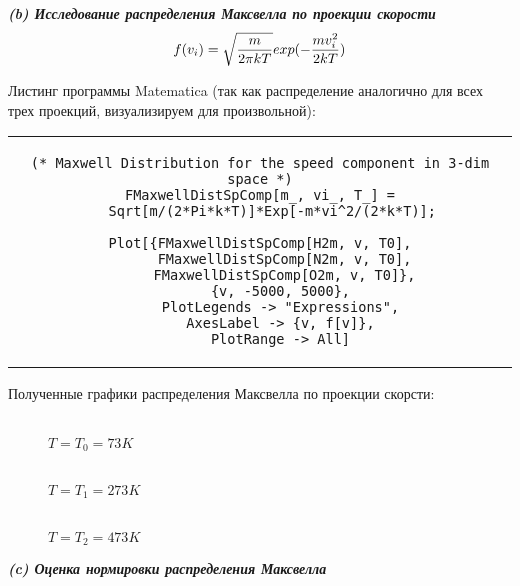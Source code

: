 
\textit{\textbf{(b) Исследование распределения Максвелла по проекции скорости}}  
\begin{equation*}
    f(v_{i}) = \sqrt{\frac{m}{2\pi kT}}\space exp(-\frac{mv_{i}^{2}}{2kT})
\end{equation*}


Листинг программы Matematica (так как распределение аналогично для всех трех проекций, визуализируем для произвольной):
\begin{center}
    \begin{tabular}{c}
    \begin{lstlisting}
(* Maxwell Distribution for the speed component in 3-dim space *)
FMaxwellDistSpComp[m_, vi_, T_] =
   Sqrt[m/(2*Pi*k*T)]*Exp[-m*vi^2/(2*k*T)];

Plot[{FMaxwellDistSpComp[H2m, v, T0],
      FMaxwellDistSpComp[N2m, v, T0],
      FMaxwellDistSpComp[O2m, v, T0]},
     {v, -5000, 5000},
     PlotLegends -> "Expressions",
     AxesLabel -> {v, f[v]},
     PlotRange -> All]
    \end{lstlisting}
    \end{tabular}
\end{center}

\newpage
Полученные графики распределения Максвелла по проекции скорсти:
\hspace{0pt}
\begin{figure}[H]
    \begin{minipage}[h]{0.47\linewidth}
        \\
        $T=T_{0}=73K$
    \end{minipage}
    \hfill
    \begin{minipage}[h]{0.47\linewidth}
        \\
        $T=T_{1}=273K$
    \end{minipage}
    \vfill
    \vspace{6pt}
    \centering 
    \begin{minipage}[h]{0.47\linewidth}
        \\
        $T=T_{2}=473K$
    \end{minipage}
\end{figure}


\textit{\textbf{(c) Оценка нормировки распределения Максвелла}}  

